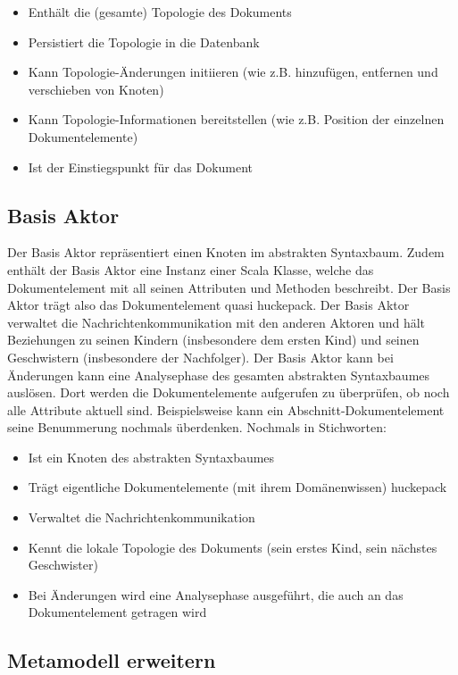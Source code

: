  
\begin{itemize}

\item Enthält die (gesamte) Topologie des Dokuments
\item Persistiert die Topologie in die Datenbank
\item Kann Topologie-Änderungen initiieren (wie z.B. hinzufügen, entfernen und verschieben von Knoten)
\item Kann Topologie-Informationen bereitstellen (wie z.B. Position der einzelnen Dokumentelemente)
\item Ist der Einstiegspunkt für das Dokument
\end{itemize}
 
\subsection{Basis Aktor}\label{}
 
Der Basis Aktor repräsentiert einen Knoten im abstrakten Syntaxbaum. Zudem enthält der Basis Aktor eine Instanz einer Scala Klasse, welche das Dokumentelement mit all seinen Attributen und Methoden beschreibt. Der Basis Aktor trägt also das Dokumentelement quasi huckepack. Der Basis Aktor verwaltet die Nachrichtenkommunikation mit den anderen Aktoren und hält Beziehungen zu seinen Kindern (insbesondere dem ersten Kind) und seinen Geschwistern (insbesondere der Nachfolger). Der Basis Aktor kann bei Änderungen kann eine Analysephase des gesamten abstrakten Syntaxbaumes auslösen. Dort werden die Dokumentelemente aufgerufen zu überprüfen, ob noch alle Attribute aktuell sind. Beispielsweise kann ein Abschnitt-Dokumentelement seine Benummerung nochmals überdenken. Nochmals in Stichworten:

 
\begin{itemize}

\item Ist ein Knoten des abstrakten Syntaxbaumes
\item Trägt eigentliche Dokumentelemente (mit ihrem Domänenwissen) huckepack
\item Verwaltet die Nachrichtenkommunikation
\item Kennt die lokale Topologie des Dokuments (sein erstes Kind, sein nächstes Geschwister)
\item Bei Änderungen wird eine Analysephase ausgeführt, die auch an das Dokumentelement getragen wird
\end{itemize}
 
\subsection{Metamodell erweitern}\label{metamodell-impl}
 

